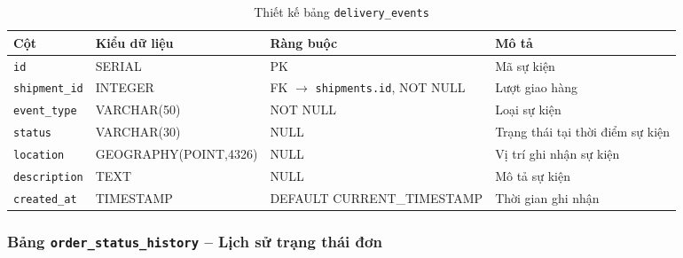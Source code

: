 \begin{table}[H]
\centering
\caption{Thiết kế bảng \texttt{delivery\_events}}
\begin{tabularx}{\textwidth}{|l|l|Z|Z|}
\hline
\textbf{Cột} &
\textbf{Kiểu dữ liệu} &
\textbf{Ràng buộc} &
\textbf{Mô tả} \\ \hline

\texttt{id}
& SERIAL
& PK
& Mã sự kiện \\ \hline

\texttt{shipment\_id}
& INTEGER
& FK $\rightarrow$ \texttt{shipments.id}, NOT NULL
& Lượt giao hàng \\ \hline

\texttt{event\_type}
& VARCHAR(50)
& NOT NULL
& Loại sự kiện \\ \hline

\texttt{status}
& VARCHAR(30)
& NULL
& Trạng thái tại thời điểm sự kiện \\ \hline

\texttt{location}
& GEOGRAPHY(POINT,4326)
& NULL
& Vị trí ghi nhận sự kiện \\ \hline

\texttt{description}
& TEXT
& NULL
& Mô tả sự kiện \\ \hline

\texttt{created\_at}
& TIMESTAMP
& DEFAULT CURRENT\_TIMESTAMP
& Thời gian ghi nhận \\ \hline

\end{tabularx}
\end{table}



\subsubsection{Bảng \texttt{order\_status\_history} -- Lịch sử trạng thái đơn}

